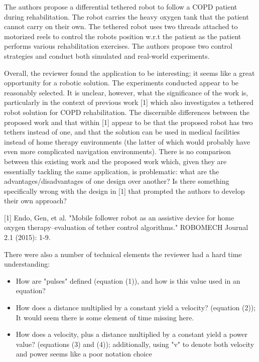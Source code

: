 \documentclass[journal,onecolumn,12pt]{IEEEtran}
\begin{document}
The authors propose a differential tethered robot to follow a COPD patient during rehabilitation. The robot carries the heavy oxygen tank that the patient cannot carry on their own. The tethered robot uses two threads attached to motorized reels to control the robots position w.r.t the patient as the patient performs various rehabilitation exercises. The authors propose two control strategies and conduct both simulated and real-world experiments.

\vspace{2em}

Overall, the reviewer found the application to be interesting; it seems like a great opportunity for a robotic solution. The experiments conducted appear to be reasonably selected. It is unclear, however, what the significance of the work is, particularly in the context of previous work [1] which also investigates a tethered robot solution for COPD rehabilitation. The discernible differences between the proposed work and that within [1] appear to be that the proposed robot has two tethers instead of one, and that the solution can be used in medical facilities instead of home therapy environments (the latter of which would probably have even more complicated navigation environments). There is no comparison between this existing work and the proposed work which, given they are essentially tackling the same application, is problematic: what are the advantages/disadvantages of one design over another? Is there something specifically wrong with the design in [1] that prompted the authors to develop their own approach?

\vspace{2em}

[1]  Endo, Gen, et al. "Mobile follower robot as an assistive device for home oxygen therapy–evaluation of tether control algorithms." ROBOMECH Journal 2.1 (2015): 1-9.

\vspace{2em}


There were also a number of technical elements the reviewer had a hard time understanding:
\begin{itemize}
\item How are "pulses" defined (equation (1)), and how is this value used in an equation?
\item How does a distance multiplied by a constant yield a velocity? (equation (2)); It would seem there is some element of time missing here.  
\item How does a velocity, plus a distance multiplied by a constant yield a power value? (equations (3) and (4)); additionally, using "v" to denote both velocity and power seems like a poor notation choice
\end{itemize}
\end{document}
